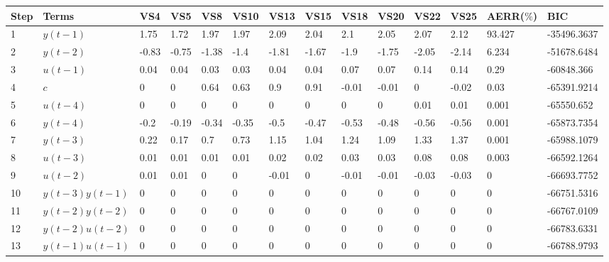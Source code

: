 \begin{tabular}{llllllllllllll}
Step & Terms & VS4 & VS5 & VS8 & VS10 & VS13 & VS15 & VS18 & VS20 & VS22 & VS25 & AERR($\%$) & BIC \\ 
\hline 
1 & $y(t-1)$ & 1.75 & 1.72 & 1.97 & 1.97 & 2.09 & 2.04 & 2.1 & 2.05 & 2.07 & 2.12 & 93.427 & -35496.3637 \\ 
2 & $y(t-2)$ & -0.83 & -0.75 & -1.38 & -1.4 & -1.81 & -1.67 & -1.9 & -1.75 & -2.05 & -2.14 & 6.234 & -51678.6484 \\ 
3 & $u(t-1)$ & 0.04 & 0.04 & 0.03 & 0.03 & 0.04 & 0.04 & 0.07 & 0.07 & 0.14 & 0.14 & 0.29 & -60848.366 \\ 
4 & $c$ & 0 & 0 & 0.64 & 0.63 & 0.9 & 0.91 & -0.01 & -0.01 & 0 & -0.02 & 0.03 & -65391.9214 \\ 
5 & $u(t-4)$ & 0 & 0 & 0 & 0 & 0 & 0 & 0 & 0 & 0.01 & 0.01 & 0.001 & -65550.652 \\ 
6 & $y(t-4)$ & -0.2 & -0.19 & -0.34 & -0.35 & -0.5 & -0.47 & -0.53 & -0.48 & -0.56 & -0.56 & 0.001 & -65873.7354 \\ 
7 & $y(t-3)$ & 0.22 & 0.17 & 0.7 & 0.73 & 1.15 & 1.04 & 1.24 & 1.09 & 1.33 & 1.37 & 0.001 & -65988.1079 \\ 
8 & $u(t-3)$ & 0.01 & 0.01 & 0.01 & 0.01 & 0.02 & 0.02 & 0.03 & 0.03 & 0.08 & 0.08 & 0.003 & -66592.1264 \\ 
9 & $u(t-2)$ & 0.01 & 0.01 & 0 & 0 & -0.01 & 0 & -0.01 & -0.01 & -0.03 & -0.03 & 0 & -66693.7752 \\ 
10 & $y(t-3)y(t-1)$ & 0 & 0 & 0 & 0 & 0 & 0 & 0 & 0 & 0 & 0 & 0 & -66751.5316 \\ 
11 & $y(t-2)y(t-2)$ & 0 & 0 & 0 & 0 & 0 & 0 & 0 & 0 & 0 & 0 & 0 & -66767.0109 \\ 
12 & $y(t-2)u(t-2)$ & 0 & 0 & 0 & 0 & 0 & 0 & 0 & 0 & 0 & 0 & 0 & -66783.6331 \\ 
13 & $y(t-1)u(t-1)$ & 0 & 0 & 0 & 0 & 0 & 0 & 0 & 0 & 0 & 0 & 0 & -66788.9793 \\ 
\hline 
\end{tabular}